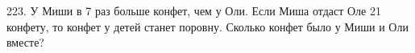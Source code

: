 223. У Миши в 7 раз больше конфет, чем у Оли. Если Миша отдаст Оле 21 конфету, то конфет у детей станет поровну. Сколько конфет было у Миши и Оли вместе?\\
